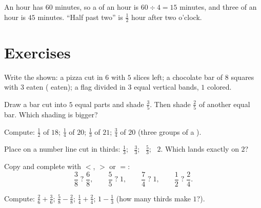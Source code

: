 \begin{example}\label{ex:g4:fractions:hour}
An hour has $60$ minutes, so a  of an hour is
$60 \div 4 = 15$ minutes, and three  of an hour is
$45$ minutes. ``Half past two'' is $\frac12$ hour after two
o'clock.
\end{example}

\section{Exercises}

\begin{exercise}[$\star$]\label{exo:g4:fractions:1}
Write the  shown: a pizza cut in $6$ with $5$ slices left;
a chocolate bar of $8$ squares with $3$ eaten ( eaten); a
flag divided in $3$ equal vertical bands, $1$ colored.
\end{exercise}

\begin{exercise}[$\star$]\label{exo:g4:fractions:2}
Draw a bar cut into $5$ equal parts and shade $\frac35$. Then shade
$\frac{2}{5}$ of another equal bar. Which shading is bigger?
\end{exercise}

\begin{exercise}[$\star$]\label{exo:g4:fractions:3}
Compute: $\frac12$ of $18$; \quad $\frac14$ of $20$; \quad
$\frac13$ of $21$; \quad $\frac34$ of $20$ (three groups of a
).
\end{exercise}

\begin{exercise}[$\star$]\label{exo:g4:fractions:4}
Place on a number line cut in thirds: $\frac13$; \ $\frac33$; \
$\frac53$; \ $2$. Which  lands exactly on $2$?
\end{exercise}

\begin{exercise}[$\star$]\label{exo:g4:fractions:5}
Copy and complete with $<$, $>$ or $=$:
\[
\frac38 \;?\; \frac68, \qquad
\frac55 \;?\; 1, \qquad
\frac74 \;?\; 1, \qquad
\frac12 \;?\; \frac24 .
\]
\end{exercise}

\begin{exercise}[$\star$]\label{exo:g4:fractions:6}
Compute: $\frac26 + \frac36$; \quad $\frac58 - \frac28$; \quad
$\frac14 + \frac24$; \quad $1 - \frac13$ (how many thirds make
$1$?).
\end{exercise}

